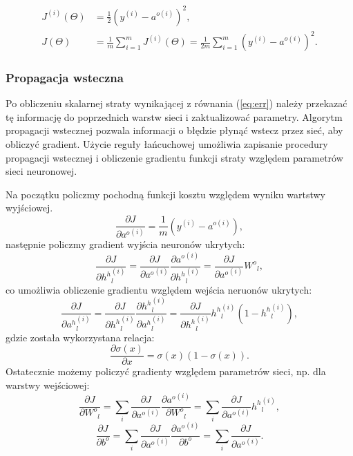 \documentclass[11pt]{book}
\theoremstyle{definition}
\begin{document}
\begin{equation}
\begin{split}
J^{(i)}(\Theta) &= \frac{1}{2} \left( y^{(i)}- a^{o{(i)}}  \right)  ^2, \\
J(\Theta) &= \frac{1}{m}\sum_{i=1}^m J^{(i)}(\Theta)= \frac{1}{2m}\sum_{i=1}^m \left( y^{(i)}- a^{o{(i)}}  \right)  ^2. \label{eq:err}
\end{split}
\end{equation}


\subsubsection{Propagacja wsteczna}

Po obliczeniu skalarnej straty wynikającej z równania (\ref{eq:err}) należy przekazać tę informację do poprzednich warstw sieci i zaktualizować parametry. Algorytm propagacji wstecznej \cite{1986Natur.323..533R} pozwala informacji o błędzie płynąć wstecz przez sieć, aby obliczyć gradient. Użycie reguły łańcuchowej umożliwia zapisanie procedury propagacji wstecznej i obliczenie gradientu funkcji straty względem parametrów sieci neuronowej. 

Na początku policzmy pochodną funkcji kosztu względem wyniku wartstwy wyjściowej.
%
\begin{equation}
\frac{\partial J}{\partial {a^o}^{(i)}} = \frac{1}{m} \left( y^{(i)}- a^{o{(i)}}  \right),
\end{equation}
%
następnie policzmy gradient wyjścia neuronów ukrytych:
%
\begin{equation}
\frac{\partial J}{\partial {h^h}^{(i)}_l} = \frac{\partial J}{\partial {a^o}^{(i)}} \frac{\partial {a^o}^{(i)}}{\partial {h^h}^{(i)}_l} =  \frac{\partial J}{\partial {a^o}^{(i)}} {W^o}_{l},
\end{equation}
%
co umożliwia obliczenie gradientu względem wejścia neruonów ukrytych:
%
\begin{equation}
\frac{\partial J}{\partial {a^h}^{(i)}_l} = \frac{\partial J}{\partial {h^h}^{(i)}_l}\frac{\partial {h^h}^{(i)}_l}{\partial {a^h}^{(i)}_l} = \frac{\partial J}{\partial {h^h}^{(i)}_l} {h^h}^{(i)}_l(1-{h^h}^{(i)}_l), 
\end{equation}
%
gdzie została wykorzystana relacja:
$$\frac{\partial \sigma(x)}{\partial x} = \sigma(x)(1-\sigma(x)).$$
%
Ostatecznie możemy policzyć gradienty względem parametrów sieci, np. dla warstwy wejściowej:
%
\begin{equation}
\frac{\partial J}{\partial {W^o}_{l}} = \sum_{i}\frac{\partial J}{\partial {a^o}^{(i)}}\frac{\partial {a^o}^{(i)}}{\partial {W^o}_{l}} = \sum_{i}\frac{\partial J}{\partial {a^o}^{(i)}}{h^h}^{(i)}_l,
\end{equation}
%
\begin{equation}
\frac{\partial J}{\partial {b^o}} = \sum_{i}\frac{\partial J}{\partial {a^o}^{(i)}}\frac{\partial {a^o}^{(i)}}{\partial {b^o}} = \sum_{i}\frac{\partial J}{\partial {a^o}^{(i)}}.
\end{equation}
\end{document}
